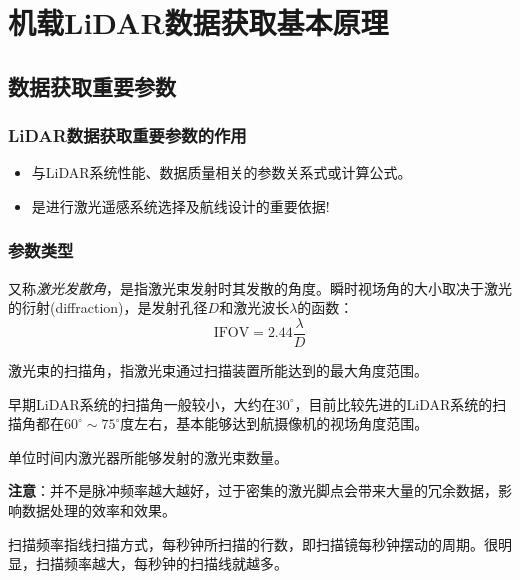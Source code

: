 
\chapter{机载LiDAR数据获取基本原理} %

\section{数据获取重要参数}  %
\subsection{LiDAR数据获取重要参数的作用}
\begin{itemize}
	\item 与LiDAR系统性能、数据质量相关的参数关系式或计算公式。
	\item 是进行激光遥感系统选择及航线设计的重要依据!
\end{itemize}

\subsection{参数类型}

 又称\textit{激光发散角}，是指激光束发射时其发散的角度。瞬时视场角的大小取决于激光的衍射(diffraction)，是发射孔径$ D $和激光波长$ λ $的函数：
\begin{equation}
\text{IFOV} = 2.44 \dfrac{\lambda}{D}
\end{equation}

 激光束的扫描角，指激光束通过扫描装置所能达到的最大角度范围。

早期LiDAR系统的扫描角一般较小，大约在$ 30^{\circ} $，目前比较先进的LiDAR系统的扫描角都在$ 60^{\circ} \sim 75^{\circ} $度左右，基本能够达到航摄像机的视场角度范围。

单位时间内激光器所能够发射的激光束数量。

\textbf{注意}：并不是脉冲频率越大越好，过于密集的激光脚点会带来大量的冗余数据，影响数据处理的效率和效果。

 扫描频率指线扫描方式，每秒钟所扫描的行数，即扫描镜每秒钟摆动的周期。很明显，扫描频率越大，每秒钟的扫描线就越多。

